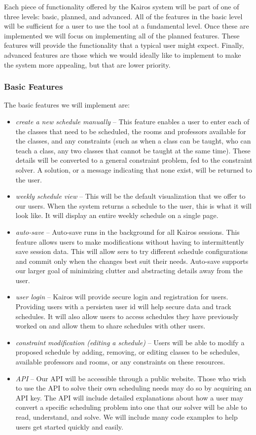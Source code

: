 \documentclass{extarticle}
\begin{document}
Each piece of functionality offered by the Kairos system will be part of one of three levels: basic, planned, and
advanced.  All of the features in the basic level will be sufficient for a user to use the tool at a fundamental
level.  Once these are implemented we will focus on implementing all of the planned features.  These features will
provide the functionality that a typical user might expect.  Finally, advanced features are those which we would
ideally like to implement to make the system more appealing, but that are lower priority.

\subsubsection{Basic Features}
The basic features we will implement are:
\begin{itemize}
\item \emph{create a new schedule manually} -- This feature enables a user to enter each of the classes that need
to be scheduled, the rooms and professors available for the classes, and any constraints (such as when a class can
be taught, who can teach a class, any two classes that cannot be taught at the same time).  These details will
be converted to a general constraint problem, fed to the constraint solver.  A solution, or a message indicating
that none exist, will be returned to the user.
\item \emph{weekly schedule view} -- This will be the default visualization that we offer to our users. When the
system returns a schedule to the user, this is what it will look like. It will display an entire weekly schedule
on a single page.
\item \emph{auto-save} -- Auto-save runs in the background for all Kairos sessions.  This feature allows users to
make modifications without having to intermittently save session data. This will allow sers to try different
schedule configurations and commit only when the changes best suit their needs.  Auto-save supports our larger goal
of minimizing clutter and abstracting details away from the user.
\item \emph{user login} -- Kairos will provide secure login and registration for users.  Providing users with a
persisten user id will help secure data and track schedules. It will also allow users to access schedules they have
previously worked on and allow them to share schedules with other users.
\item \emph{constraint modification (editing a schedule)} -- Users will be able to modify a proposed schedule by
adding, removing, or editing classes to be schedules, available professors and rooms, or any constraints on these
resources.
\item \emph{API} -- Our API will be accessible through a public website.  Those who wish to use the
API to solve their own scheduling needs may do so by acquiring an API key.  The API will include detailed
explanations about how a user may convert a specific scheduling problem into one that our solver will be able to
read, understand, and solve.  We will include many code examples to help users get started quickly and easily.
\end{itemize}
\end{document}

